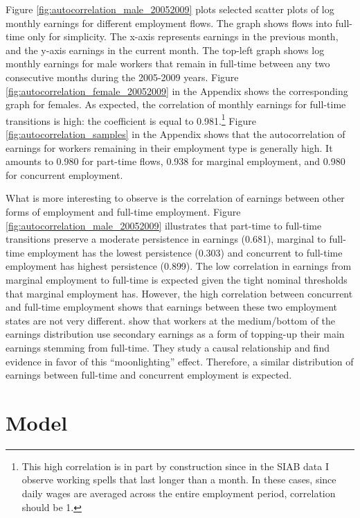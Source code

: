 \documentclass[12pt, a4paper]{article}
\let\Oldsection\section
\renewcommand{\section}{\FloatBarrier\Oldsection}
\begin{document}
Figure \ref{fig:autocorrelation_male_20052009} plots selected scatter plots of log monthly earnings for different employment flows. The graph shows flows into full-time only for simplicity. The x-axis represents earnings in the previous month, and the y-axis earnings in the current month. The top-left graph shows log monthly earnings for male workers that remain in full-time between any two consecutive months during the 2005-2009 years. Figure \ref{fig:autocorrelation_female_20052009} in the Appendix shows the corresponding graph for females. As expected, the correlation of monthly earnings for full-time transitions is high: the coefficient is equal to 0.981.\footnote{This high correlation is in part by construction since in the SIAB data I observe working spells that last longer than a month. In these cases, since daily wages are averaged across the entire employment period, correlation should be 1.} Figure \ref{fig:autocorrelation_samples} in the Appendix shows that the autocorrelation of earnings for workers remaining in their employment type is generally high. It amounts to 0.980 for part-time flows, 0.938 for marginal employment, and 0.980 for concurrent employment.

What is more interesting to observe is the correlation of earnings between other forms of employment and full-time employment. Figure \ref{fig:autocorrelation_male_20052009} illustrates that part-time to full-time transitions preserve a moderate persistence in earnings (0.681), marginal to full-time employment has the lowest persistence (0.303) and concurrent to full-time employment has highest persistence (0.899). The low correlation in earnings from marginal employment to full-time is expected given the tight nominal thresholds that marginal employment has. However, the high correlation between concurrent and full-time employment shows that earnings between these two employment states are not very different. \cite{CaLaRo18} show that workers at the medium/bottom of the earnings distribution use secondary earnings as a form of topping-up their main earnings stemming from full-time. They study a causal relationship and find evidence in favor of this ``moonlighting'' effect. Therefore, a similar distribution of earnings between full-time and concurrent employment is expected.


\section{Model}\label{Sec:Model}
\end{document}
